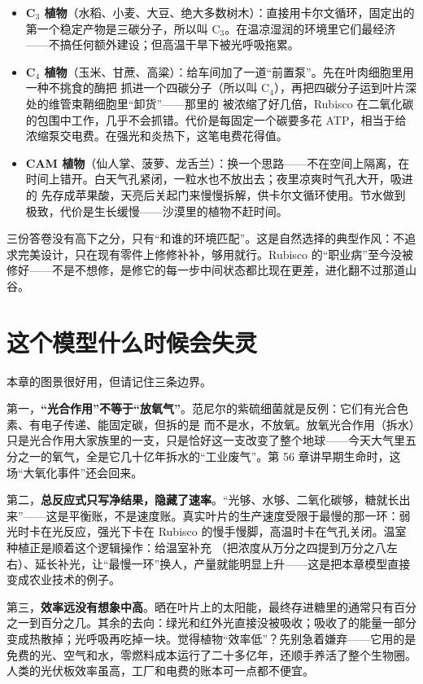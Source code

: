 \begin{itemize}[itemsep=2pt]
\item \textbf{C$_3$ 植物}（水稻、小麦、大豆、绝大多数树木）：直接用卡尔文循环，固定出的第一个稳定产物是三碳分子，所以叫 C$_3$。在温凉湿润的环境里它们最经济——不搞任何额外建设；但高温干旱下被光呼吸拖累。
\item \textbf{C$_4$ 植物}（玉米、甘蔗、高粱）：给车间加了一道“前置泵”。先在叶肉细胞里用一种不挑食的酶把  抓进一个四碳分子（所以叫 C$_4$），再把四碳分子运到叶片深处的维管束鞘细胞里“卸货”——那里的  被浓缩了好几倍，Rubisco 在二氧化碳的包围中工作，几乎不会抓错。代价是每固定一个碳要多花 ATP，相当于给浓缩泵交电费。在强光和炎热下，这笔电费花得值。
\item \textbf{CAM 植物}（仙人掌、菠萝、龙舌兰）：换一个思路——不在空间上隔离，在时间上错开。白天气孔紧闭，一粒水也不放出去；夜里凉爽时气孔大开，吸进的  先存成苹果酸，天亮后关起门来慢慢拆解，供卡尔文循环使用。节水做到极致，代价是生长缓慢——沙漠里的植物不赶时间。
\end{itemize}

三份答卷没有高下之分，只有“和谁的环境匹配”。这是自然选择的典型作风：不追求完美设计，只在现有零件上修修补补，够用就行。Rubisco 的“职业病”至今没被修好——不是不想修，是修它的每一步中间状态都比现在更差，进化翻不过那道山谷。

\section{这个模型什么时候会失灵}

本章的图景很好用，但请记住三条边界。

第一，\textbf{“光合作用”不等于“放氧气”}。范尼尔的紫硫细菌就是反例：它们有光合色素、有电子传递、能固定碳，但拆的是  而不是水，不放氧。放氧光合作用（拆水）只是光合作用大家族里的一支，只是恰好这一支改变了整个地球——今天大气里五分之一的氧气，全是它几十亿年拆水的“工业废气”。第 56 章讲早期生命时，这场“大氧化事件”还会回来。

第二，\textbf{总反应式只写净结果，隐藏了速率}。“光够、水够、二氧化碳够，糖就长出来”——这是平衡账，不是速度账。真实叶片的生产速度受限于最慢的那一环：弱光时卡在光反应，强光下卡在 Rubisco 的慢手慢脚，高温时卡在气孔关闭。温室种植正是顺着这个逻辑操作：给温室补充 （把浓度从万分之四提到万分之八左右）、延长补光，让“最慢一环”换人，产量就能明显上升——这是把本章模型直接变成农业技术的例子。

第三，\textbf{效率远没有想象中高}。晒在叶片上的太阳能，最终存进糖里的通常只有百分之一到百分之几。其余的去向：绿光和红外光直接没被吸收；吸收了的能量一部分变成热散掉；光呼吸再吃掉一块。觉得植物“效率低”？先别急着嫌弃——它用的是免费的光、空气和水，零燃料成本运行了二十多亿年，还顺手养活了整个生物圈。人类的光伏板效率虽高，工厂和电费的账本可一点都不便宜。

